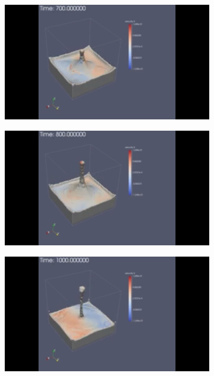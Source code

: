 \documentclass[10pt,a4paper,notitlepage]{article}
\begin{document}
\begin{figure}[H]
\begin{subfigure}{0.25\textwidth}
\end{subfigure}
\centering
\begin{subfigure}{0.25\textwidth}
  \includegraphics[width=1.0\linewidth]{drop/4.png}
\end{subfigure}%
\begin{subfigure}{0.25\textwidth}
  \includegraphics[width=1.0\linewidth]{drop/5.png}
\end{subfigure}
\begin{subfigure}{0.25\textwidth}
  \includegraphics[width=1.0\linewidth]{drop/6.png}

\end{subfigure}
\end{figure}
\end{document}
